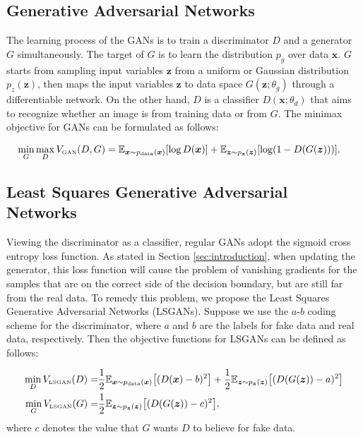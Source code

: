\documentclass{article} %
\begin{document}
\subsection{Generative Adversarial Networks} 
The learning process of the GANs is to train a discriminator $D$ and a generator $G$ simultaneously. The target of $G$ is to learn the distribution $p_g$ over data $\bm{x}$. $G$ starts from sampling input variables $\bm{z}$ from a uniform or Gaussian distribution $p_z(\bm{z})$, then maps the input variables $\bm{z}$ to data space $G(\bm{z}; \theta_g)$ through a differentiable network. On the other hand, $D$ is a classifier $D(\bm{x}; \theta_d)$ that aims to recognize whether an image is from training data or from $G$. The minimax objective for GANs can be formulated as follows:

\begin{equation}
\label{eq_gan}
\begin{split}
\min_G \max_D V_{\text{\tiny GAN}}(D, G) = \mathbb{E}_{\bm{x} \sim p_{\text{data}}(\bm{x})}[\log D(\bm{x})] + \mathbb{E}_{\bm{z} \sim p_{\bm{z}}(\bm{z})}[\log (1 - D(G(\bm{z})))]&.
\end{split}
\end{equation}

\subsection{Least Squares Generative Adversarial Networks}
\label{sec:lsgan}
Viewing the discriminator as a classifier, regular GANs adopt the sigmoid cross entropy loss function. As stated in Section \ref{sec:introduction}, when updating the generator, this loss function will cause the problem of vanishing gradients for the samples that are on the correct side of the decision boundary, but are still far from the real data. To remedy this problem, we propose the Least Squares Generative Adversarial Networks (LSGANs). Suppose we use the $a$-$b$ coding scheme for the discriminator, where $a$ and $b$ are the labels for fake data and real data,  respectively. Then the objective functions for LSGANs can be defined as follows:

\begin{equation}
\label{eq:lsgan}
\begin{split}
\min_D V_{\text{\tiny LSGAN}}(D) = &\frac{1}{2}\mathbb{E}_{\bm{x} \sim p_{\text{data}}(\bm{x})}\bigl[(D(\bm{x})-b)^2\bigr]+ \frac{1}{2}\mathbb{E}_{\bm{z} \sim p_{\bm{z}}(\bm{z})}\bigl[(D(G(\bm{z}))-a)^2\bigr] \\
\min_G V_{\text{\tiny LSGAN}}(G) = &\frac{1}{2}\mathbb{E}_{\bm{z} \sim p_{\bm{z}}(\bm{z})}\bigl[(D(G(\bm{z}))-c)^2\bigr],
\end{split}
\end{equation}
where $c$ denotes the value that $G$ wants $D$ to believe for fake data.
\end{document}
